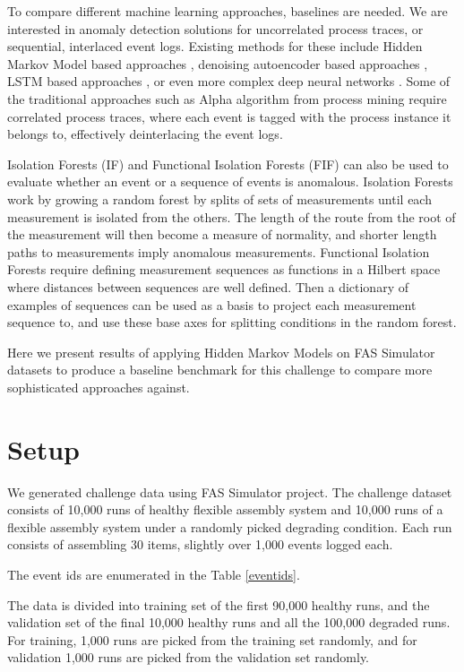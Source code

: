 \documentclass[journal]{IEEEtran}
\begin{document}
To compare different machine learning approaches, baselines are needed. We are interested in anomaly detection solutions for uncorrelated process traces, or sequential, interlaced event logs. Existing methods for these include Hidden Markov Model based approaches \cite{gornitz2015hidden}\cite{joshi2005investigating}, denoising autoencoder based approaches \cite{nolle2016unsupervised}, LSTM based approaches \cite{yuan2021recompose}\cite{du2017deeplog}, or even more complex deep neural networks \cite{zhang2019robust}. Some of the traditional approaches such as Alpha algorithm from process mining require correlated process traces, where each event is tagged with the process instance it belongs to, effectively deinterlacing the event logs.

Isolation Forests\cite{liu2008isolation} (IF) and Functional Isolation Forests\cite{staerman2019functional} (FIF) can also be used to evaluate whether an event or a sequence of events is anomalous. Isolation Forests work by growing a random forest by splits of sets of measurements until each measurement is isolated from the others. The length of the route from the root of the measurement will then become a measure of normality, and shorter length paths to measurements imply anomalous measurements. Functional Isolation Forests require defining measurement sequences as functions in a Hilbert space where distances between sequences are well defined. Then a dictionary of examples of sequences can be used as a basis to project each measurement sequence to, and use these base axes for splitting conditions in the random forest.

Here we present results of applying Hidden Markov Models on FAS Simulator datasets to produce a baseline benchmark for this challenge to compare more sophisticated approaches against.

\section{Setup}

We generated challenge data using FAS Simulator project\cite{FASSimulator}. The challenge dataset consists of 10,000 runs of healthy flexible assembly system and 10,000 runs of a flexible assembly system under a randomly picked degrading condition. Each run consists of assembling 30 items, slightly over 1,000 events logged each.

The event ids are enumerated in the Table \ref{eventids}. 

The data is divided into training set of the first 90,000 healthy runs, and the validation set of the final 10,000 healthy runs and all the 100,000 degraded runs. For training, 1,000 runs are picked from the training set randomly, and for validation 1,000 runs are picked from the validation set randomly.
\end{document}
